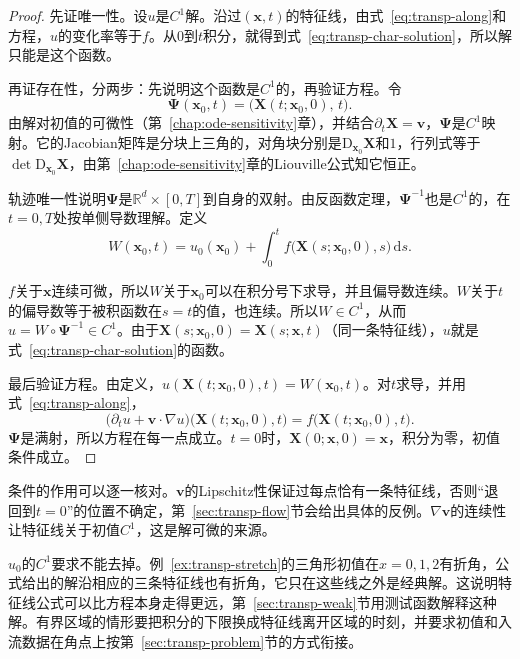\begin{proof}
先证唯一性。设$u$是$C^{1}$解。沿过$(\bm{x},t)$的特征线，由式~\eqref{eq:transp-along}和方程，$u$的变化率等于$f$。从$0$到$t$积分，就得到式~\eqref{eq:transp-char-solution}，所以解只能是这个函数。

再证存在性，分两步：先说明这个函数是$C^{1}$的，再验证方程。令
\[
  \bm{\Psi}(\bm{x}_0,t)=\bigl(\bm{X}(t;\bm{x}_0,0),\,t\bigr).
\]
由解对初值的可微性（第~\ref{chap:ode-sensitivity}章），并结合$\partial_t\bm{X}=\bm{v}$，$\bm{\Psi}$是$C^{1}$映射。它的Jacobian矩阵是分块上三角的，对角块分别是$\mathrm{D}_{\bm{x}_0}\bm{X}$和$1$，行列式等于$\det\mathrm{D}_{\bm{x}_0}\bm{X}$，由第~\ref{chap:ode-sensitivity}章的Liouville公式知它恒正。

轨迹唯一性说明$\bm{\Psi}$是$\mathbb{R}^{d}\times[0,T]$到自身的双射。由反函数定理，$\bm{\Psi}^{-1}$也是$C^{1}$的，在$t=0,T$处按单侧导数理解。定义
\[
  W(\bm{x}_0,t)=u_0(\bm{x}_0)+\int_0^{t}f\bigl(\bm{X}(s;\bm{x}_0,0),s\bigr)\,\mathrm{d}s.
\]

$f$关于$\bm{x}$连续可微，所以$W$关于$\bm{x}_0$可以在积分号下求导，并且偏导数连续。$W$关于$t$的偏导数等于被积函数在$s=t$的值，也连续。所以$W\in C^{1}$，从而$u=W\circ\bm{\Psi}^{-1}\in C^{1}$。由于$\bm{X}(s;\bm{x}_0,0)=\bm{X}(s;\bm{x},t)$（同一条特征线），$u$就是式~\eqref{eq:transp-char-solution}的函数。

最后验证方程。由定义，$u(\bm{X}(t;\bm{x}_0,0),t)=W(\bm{x}_0,t)$。对$t$求导，并用式~\eqref{eq:transp-along}，
\[
  \bigl(\partial_tu+\bm{v}\cdot\nabla u\bigr)\bigl(\bm{X}(t;\bm{x}_0,0),t\bigr)=f\bigl(\bm{X}(t;\bm{x}_0,0),t\bigr).
\]
$\bm{\Psi}$是满射，所以方程在每一点成立。$t=0$时，$\bm{X}(0;\bm{x},0)=\bm{x}$，积分为零，初值条件成立。
\end{proof}

条件的作用可以逐一核对。$\bm{v}$的Lipschitz性保证过每点恰有一条特征线，否则“退回到$t=0$”的位置不确定，第~\ref{sec:transp-flow}节会给出具体的反例。$\nabla\bm{v}$的连续性让特征线关于初值$C^{1}$，这是解可微的来源。

$u_0$的$C^{1}$要求不能去掉。例~\ref{ex:transp-stretch}的三角形初值在$x=0,1,2$有折角，公式给出的解沿相应的三条特征线也有折角，它只在这些线之外是经典解。这说明特征线公式可以比方程本身走得更远，第~\ref{sec:transp-weak}节用测试函数解释这种解。有界区域的情形要把积分的下限换成特征线离开区域的时刻，并要求初值和入流数据在角点上按第~\ref{sec:transp-problem}节的方式衔接。
